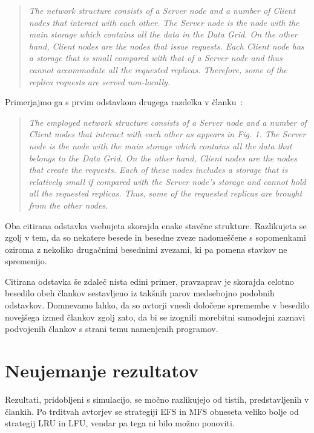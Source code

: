 \documentclass[a4paper, 12pt]{book}
\newenvironment{itquote}
{\begin{quote}\itshape}
{\end{quote}}
\begin{document}
\begin{itquote}
The network structure consists of a Server node and a number of
Client nodes that interact with each other. The Server node is the node
with the main storage which contains all the data in the Data Grid. On
the other hand, Client nodes are the nodes that issue requests. Each
Client node has a storage that is small compared with that of a Server
node and thus cannot accommodate all the requested replicas.
Therefore, some of the replica requests are served non-locally.
\end{itquote}

Primerjajmo ga s prvim odstavkom drugega razdelka v članku~\cite{mfs2012}:

\begin{itquote}
The employed network structure consists of a Server node and a number of
Client nodes that interact with each other as appears in Fig. 1. The Server
node is the node with the main storage which contains all the data that
belongs to the Data Grid. On the other hand, Client nodes are the nodes that
create the requests. Each of these nodes includes a storage that is relatively
small if compared with the Server node’s storage and cannot hold all the
requested replicas. Thus, some of the requested replicas are brought from the
other nodes.
\end{itquote}

Oba citirana odstavka vsebujeta skorajda enake stavčne strukture. Razlikujeta
se zgolj v tem, da so nekatere besede in besedne zveze nadomeščene s
sopomenkami oziroma z nekoliko drugačnimi besednimi zvezami, ki pa pomena
stavkov ne spremenijo.

Citirana odstavka še zdaleč nista edini primer, pravzaprav je skorajda
celotno besedilo obeh člankov sestavljeno iz takšnih parov medsebojno podobnih
odstavkov. Domnevamo lahko, da so avtorji vnesli določene spremembe v besedilo
novejšega izmed člankov zgolj zato, da bi se izognili morebitni samodejni
zaznavi podvojenih člankov s strani temu namenjenih programov.

\section{Neujemanje rezultatov}
\label{s:results_mismatch}

Rezultati, pridobljeni s simulacijo, se močno razlikujejo od tistih,
predstavljenih v člankih. Po trditvah avtorjev se strategiji EFS in MFS
obneseta veliko bolje od strategij LRU in LFU, vendar pa tega ni bilo možno
ponoviti.
\end{document}
